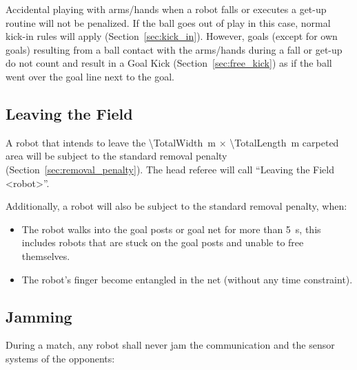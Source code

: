 Accidental playing with arms/hands when a robot falls or executes a get-up routine will not be penalized. If the ball goes out of play in this case, normal kick-in rules will apply (\cf Section~\ref{sec:kick_in}). However, goals (except for own goals) resulting from a ball contact with the arms/hands during a fall or get-up do not count and result in a Goal Kick (\cf Section~\ref{sec:free_kick}) as if the ball went over the goal line next to the goal.

\subsection{Leaving the Field}
\label{sec:leaving_field}

A robot that intends to leave the \qty{\TotalWidth}{\metre} $\times$ \qty{\TotalLength}{\metre} carpeted area will be subject to the standard removal penalty (\cf Section~\ref{sec:removal_penalty}).
The head referee will call ``Leaving the Field \textless robot\textgreater''.

Additionally, a robot will also be subject to the standard removal penalty, when:

\begin{itemize}
  \item The robot walks into the goal posts or goal net for more than \qty{5}{\second}, this includes robots that are stuck on the goal posts and unable to free themselves.
  \item The robot's finger become entangled in the net (without any time constraint).
\end{itemize}


\subsection{Jamming}
\label{sec:jamming}
During a match, any robot shall never jam the communication and the sensor systems of the opponents:

